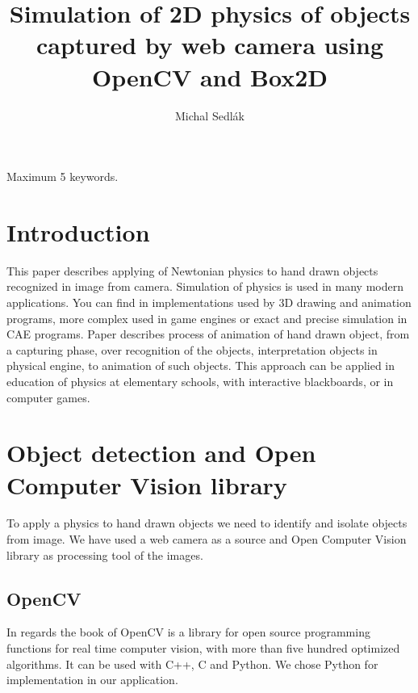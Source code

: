 \documentclass{ifacconf}
\begin{document}
\begin{frontmatter}
\title{Simulation of 2D physics of objects captured by web camera using OpenCV
and Box2D}
\author[Bratislava]{Michal Sedlák}
\address[Bratislava]{Faculty of Electrical Engineering and Information
Technology, Slovak University of Technology, Ilkovičova 3, 812 19 Bratislava,
Slovakia
\\
(e-mail: michal.sedlak@stuba.sk)}
\begin{abstract}

\end{abstract}
\begin{keyword}
Maximum 5 keywords.
\end{keyword}
\end{frontmatter}

\section{Introduction}
This paper describes applying of Newtonian physics to hand drawn objects
recognized in image from camera. Simulation of physics is used in many modern
applications. You can find in implementations used by 3D drawing and animation
programs, more complex used in game engines or exact and precise simulation in
CAE programs. Paper describes process of animation of hand drawn object, from a
capturing phase, over recognition of the objects, interpretation objects in
physical engine, to animation of such objects. This approach can be applied in
education of physics at elementary schools, with interactive blackboards, or in
computer games.

\section{Object detection and Open Computer Vision library}
To apply a physics to hand drawn objects we need to identify and isolate
objects from image. We have used a web camera as a source and Open Computer
Vision library as processing tool of the images.

\subsection{OpenCV}
In regards the book of \cite{OpenCV} OpenCV  is a library for open source
programming functions for real time computer vision, with more than five hundred
optimized algorithms. It can be used with C++, C and Python. We chose Python for
implementation in our application.
\end{document}
